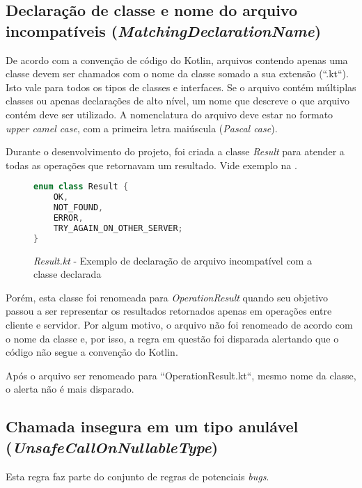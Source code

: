 \subsection{Declaração de classe e nome do arquivo incompatíveis (\textit{MatchingDeclarationName})}

De acordo com a convenção de código do Kotlin\cite{kotlin_code_conventions}, arquivos contendo apenas uma classe devem ser chamados com o nome da classe somado a sua extensão (``.kt``). Isto vale para todos os tipos de classes e interfaces. Se o arquivo contém múltiplas classes ou apenas declarações de alto nível, um nome que descreve o que arquivo contém deve ser utilizado. A nomenclatura do arquivo deve estar no formato \textit{upper camel case}, com a primeira letra maiúscula (\textit{Pascal case}).

Durante o desenvolvimento do projeto, foi criada a classe \textit{Result} para atender a todas as operações que retornavam um resultado. Vide exemplo na .

\begin{figure}[H]
    \centering
    \begin{lstlisting}[language=Kotlin]
enum class Result {
    OK,
    NOT_FOUND,
    ERROR,
    TRY_AGAIN_ON_OTHER_SERVER;
}
    \end{lstlisting}
    \caption{\textit{Result.kt} - Exemplo de declaração de arquivo incompatível com a classe declarada}
    \label{fig:detekt_matching_declaration_name_before_example}
\end{figure}

Porém, esta classe foi renomeada para \textit{OperationResult} quando seu objetivo passou a ser representar os resultados retornados apenas em operações entre cliente e servidor. Por algum motivo, o arquivo não foi renomeado de acordo com o nome da classe e, por isso, a regra em questão foi disparada alertando que o código não segue a convenção do Kotlin.

Após o arquivo ser renomeado para ``OperationResult.kt``, mesmo nome da classe, o alerta não é mais disparado.

\subsection{Chamada insegura em um tipo anulável (\textit{UnsafeCallOnNullableType})}

Esta regra faz parte do conjunto de regras de potenciais \textit{bugs}.

